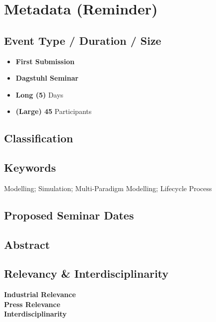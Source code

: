 \section{Metadata (Reminder)}
\label{sec:Metadata}

\subsection{Event Type / Duration / Size}
\label{sec:EventTypeDurationSize}

\begin{itemize}
	\item \textbf{First Submission}
	\item \textbf{Dagstuhl Seminar}
	\item \textbf{Long (5)} Days
	\item \textbf{(Large) 45} Participants
\end{itemize}

\subsection{Classification}
\label{sec:Classification}



\subsection{Keywords}
\label{sec:Keywords}

Modelling; Simulation; Multi-Paradigm Modelling; Lifecycle Process

\subsection{Proposed Seminar Dates}
\label{sec:ProposedDates}

\subsection{Abstract}
\label{sec:Abstract}



\subsection{Relevancy \& Interdisciplinarity}
\label{sec:Relevancy-Interdisciplinarity}

\begin{description}
	\item[\textbf{Industrial Relevance}]
	
	\item[\textbf{Press Relevance}]
	
	\item[\textbf{Interdisciplinarity}] 
\end{description}


